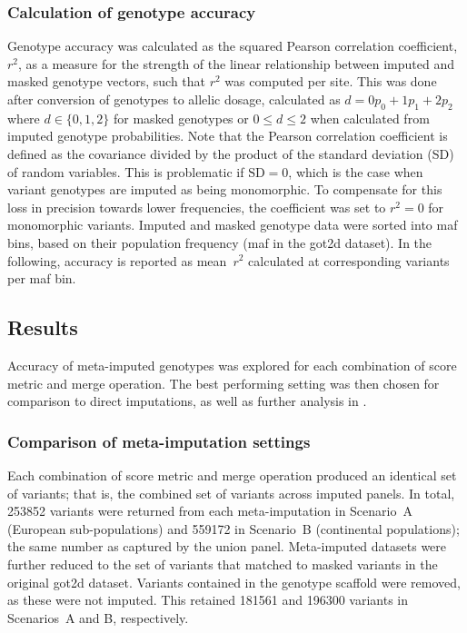 \subsubsection{Calculation of genotype accuracy}

Genotype accuracy was calculated as the squared Pearson correlation coefficient, $r^2$, as a measure for the strength of the linear relationship between imputed and masked genotype vectors, such that $r^2$ was computed per site.
This was done after conversion of genotypes to allelic dosage, calculated as ${d=0p_{0}+1p_{1}+2p_{2}}$ where ${d \in \lbrace 0,1,2 \rbrace}$ for masked genotypes or ${0 \leq d \leq 2}$ when calculated from imputed genotype probabilities.
Note that the Pearson correlation coefficient is defined as the covariance divided by the product of the standard deviation (SD) of  random variables.
This is problematic if $\text{SD}=0$, which is the case when variant genotypes are imputed as being monomorphic.
To compensate for this loss in precision towards lower frequencies, the coefficient was set to ${r^2=0}$ for monomorphic variants.
Imputed and masked genotype data were sorted into \gls{maf} bins, based on their population frequency (\gls{maf} in the \gls{got2d} dataset).
In the following, accuracy is reported as mean~$r^2$ calculated at corresponding variants per \gls{maf} bin.


%
\subsection{Results}
\label{metaimpute_accuracy_results}
%

Accuracy of meta-imputed genotypes was explored for each combination of score metric and merge operation.
The best performing setting was then chosen for comparison to direct imputations, as well as further analysis in .

\subsubsection{Comparison of meta-imputation settings}

Each combination of score metric and merge operation produced an identical set of variants; that is, the combined set of variants across imputed panels.
In total, \num{253852} variants were returned from each meta-imputation in Scenario~A (European sub-populations) and \num{559172} in Scenario~B (continental populations); \ie the same number as captured by the union panel.
Meta-imputed datasets were further reduced to the set of variants that matched to masked variants in the original \gls{got2d} dataset.
Variants contained in the genotype scaffold were removed, as these were not imputed.
This retained \num{181561} and \num{196300} variants in Scenarios~A and B, respectively.

